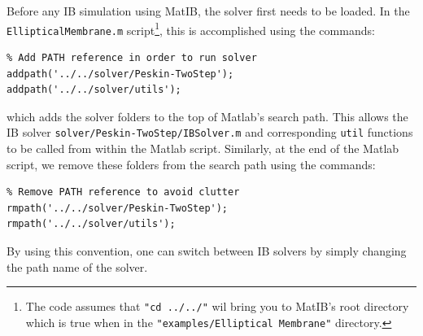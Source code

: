 \documentclass{article}
\newcommand{\mycode}[1]{\texttt{#1}}
\begin{document}
Before any IB simulation using MatIB, the solver first needs to be loaded. 
In the \mycode{EllipticalMembrane.m} script\footnote{The code assumes that \mycode{"cd ../../"} wil bring you to MatIB's root directory 
which is true when in the \mycode{"examples/Elliptical Membrane"} directory.}, this is accomplished using the commands:
\begin{lstlisting}
% Add PATH reference in order to run solver
addpath('../../solver/Peskin-TwoStep');
addpath('../../solver/utils');
\end{lstlisting}
which adds the solver folders to the top of Matlab's search path.
This allows the IB solver \mycode{solver/Peskin-TwoStep/IBSolver.m} and corresponding \mycode{util} functions to be called 
from within the Matlab script. Similarly, at the end of the Matlab script, we remove these folders from the search path 
using the commands:
\begin{lstlisting}
% Remove PATH reference to avoid clutter
rmpath('../../solver/Peskin-TwoStep');
rmpath('../../solver/utils');
\end{lstlisting}
By using this convention, one can switch between IB solvers by simply changing the path name of the solver.
\end{document}
